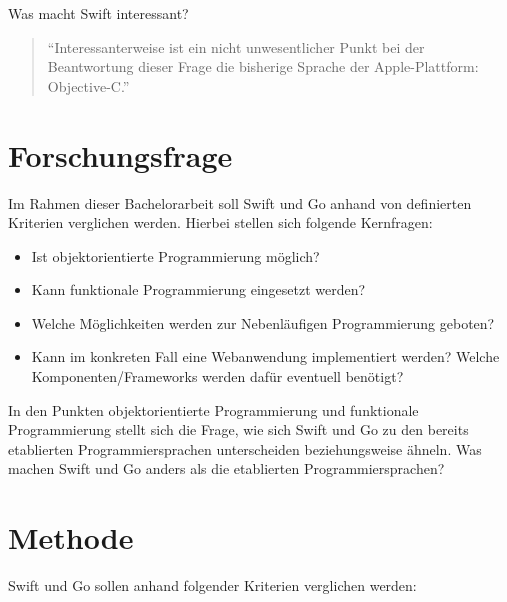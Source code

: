 \documentclass[
    paper=a4,
    bibtotocnumbered,
    liststotocnumbered,
    oneside,
    12pt,
    listof=totoc,
    toc=chapterentrywithdots,
    listof=entryprefix,
]{scrartcl}
\begin{document}
Was macht Swift interessant?
\begin{quote} 
\enquote{Interessanterweise ist ein nicht unwesentlicher Punkt bei der Beantwortung dieser Frage die bisherige Sprache der Apple-Plattform: Objective-C.} \cite{Popp.2015}
\end{quote}

\section{Forschungsfrage}
Im Rahmen dieser Bachelorarbeit soll Swift und Go anhand von definierten Kriterien verglichen werden. Hierbei stellen sich folgende Kernfragen:

\begin{samepage}
\begin{itemize}
    \item Ist objektorientierte Programmierung möglich? 
    \item Kann funktionale Programmierung eingesetzt werden?
    \item Welche Möglichkeiten werden zur Nebenläufigen Programmierung geboten?
    \item Kann im konkreten Fall eine Webanwendung implementiert werden? Welche Komponenten/Frameworks werden dafür eventuell benötigt?
\end{itemize}
\end{samepage}

In den Punkten objektorientierte Programmierung und funktionale Programmierung stellt sich die Frage, wie sich Swift und Go zu den bereits etablierten Programmiersprachen unterscheiden beziehungsweise ähneln. 
Was machen Swift und Go anders als die etablierten Programmiersprachen?

\section{Methode}
Swift und Go sollen anhand folgender Kriterien verglichen werden:
\end{document}
